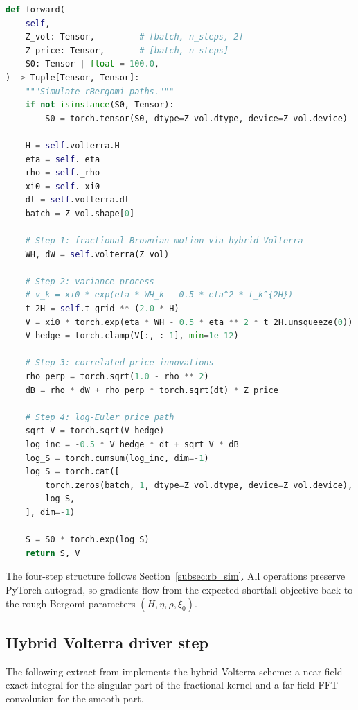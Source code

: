 \documentclass[12pt,a4paper]{article}
\theoremstyle{definition}
\theoremstyle{plain}
\theoremstyle{remark}
\theoremstyle{plain}
\begin{document}
\begin{lstlisting}[language=Python, caption={DifferentiableRoughBergomi.forward}, label={lst:rbergomi_code}]
def forward(
    self,
    Z_vol: Tensor,         # [batch, n_steps, 2]
    Z_price: Tensor,       # [batch, n_steps]
    S0: Tensor | float = 100.0,
) -> Tuple[Tensor, Tensor]:
    """Simulate rBergomi paths."""
    if not isinstance(S0, Tensor):
        S0 = torch.tensor(S0, dtype=Z_vol.dtype, device=Z_vol.device)

    H = self.volterra.H
    eta = self._eta
    rho = self._rho
    xi0 = self._xi0
    dt = self.volterra.dt
    batch = Z_vol.shape[0]

    # Step 1: fractional Brownian motion via hybrid Volterra
    WH, dW = self.volterra(Z_vol)

    # Step 2: variance process
    # v_k = xi0 * exp(eta * WH_k - 0.5 * eta^2 * t_k^{2H})
    t_2H = self.t_grid ** (2.0 * H)
    V = xi0 * torch.exp(eta * WH - 0.5 * eta ** 2 * t_2H.unsqueeze(0))
    V_hedge = torch.clamp(V[:, :-1], min=1e-12)

    # Step 3: correlated price innovations
    rho_perp = torch.sqrt(1.0 - rho ** 2)
    dB = rho * dW + rho_perp * torch.sqrt(dt) * Z_price

    # Step 4: log-Euler price path
    sqrt_V = torch.sqrt(V_hedge)
    log_inc = -0.5 * V_hedge * dt + sqrt_V * dB
    log_S = torch.cumsum(log_inc, dim=-1)
    log_S = torch.cat([
        torch.zeros(batch, 1, dtype=Z_vol.dtype, device=Z_vol.device),
        log_S,
    ], dim=-1)

    S = S0 * torch.exp(log_S)
    return S, V
\end{lstlisting}

The four-step structure follows Section~\ref{subsec:rb_sim}. All
operations preserve PyTorch autograd, so gradients flow from the
expected-shortfall objective back to the rough Bergomi parameters
$(H, \eta, \rho, \xi_0)$.

\subsection{Hybrid Volterra driver step}
\label{lst:hybrid_volterra}

The following extract from 
implements the hybrid Volterra scheme: a near-field exact integral
for the singular part of the fractional kernel and a far-field FFT
convolution for the smooth part.
\end{document}
